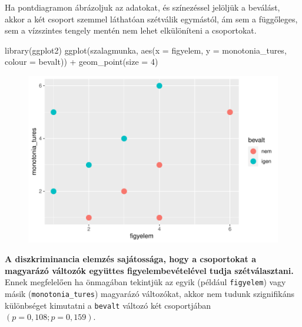 \documentclass[
  letterpaper,
]{krantz}
\makeatletter
\newenvironment{Shaded}{\begin{snugshade}}{\end{snugshade}}
\newcommand{\AttributeTok}[1]{\textcolor[rgb]{0.40,0.45,0.13}{#1}}
\newcommand{\CommentTok}[1]{\textcolor[rgb]{0.37,0.37,0.37}{#1}}
\newcommand{\DecValTok}[1]{\textcolor[rgb]{0.68,0.00,0.00}{#1}}
\newcommand{\FunctionTok}[1]{\textcolor[rgb]{0.28,0.35,0.67}{#1}}
\newcommand{\NormalTok}[1]{\textcolor[rgb]{0.00,0.23,0.31}{#1}}
\newcommand{\SpecialCharTok}[1]{\textcolor[rgb]{0.37,0.37,0.37}{#1}}
\newenvironment{kframe}{%
\medskip{}
\setlength{\fboxsep}{.8em}
 \def\at@end@of@kframe{}%
 \ifinner\ifhmode%
  \def\at@end@of@kframe{\end{minipage}}%
  \begin{minipage}{\columnwidth}%
 \fi\fi%
 \def\FrameCommand##1{\hskip\@totalleftmargin \hskip-\fboxsep
 \colorbox{shadecolor}{##1}\hskip-\fboxsep
     \hskip-\linewidth \hskip-\@totalleftmargin \hskip\columnwidth}%
 \MakeFramed {\advance\hsize-\width
   \@totalleftmargin\z@ \linewidth\hsize
   \@setminipage}}%
 {\par\unskip\endMakeFramed%
 \at@end@of@kframe}
\renewenvironment{Shaded}{\begin{kframe}}{\end{kframe}}
\makeatother
\begin{document}
Ha pontdiagramon ábrázoljuk az adatokat, és színezéssel jelöljük a
beválást, akkor a két csoport szemmel láthatóan szétválik egymástól, ám
sem a függőleges, sem a vízszintes tengely mentén nem lehet elkülöníteni
a csoportokat.

\begin{Shaded}
\begin{Highlighting}[]
\FunctionTok{library}\NormalTok{(ggplot2)}
\FunctionTok{ggplot}\NormalTok{(szalagmunka, }\FunctionTok{aes}\NormalTok{(}\AttributeTok{x =}\NormalTok{ figyelem, }\AttributeTok{y =}\NormalTok{ monotonia\_tures, }\AttributeTok{colour =}\NormalTok{ bevalt)) }\SpecialCharTok{+}
    \FunctionTok{geom\_point}\NormalTok{(}\AttributeTok{size =} \DecValTok{4}\NormalTok{)}
\end{Highlighting}
\end{Shaded}

\begin{figure}[H]

{\centering \includegraphics{./sec_diszkrimninancia_files/figure-pdf/unnamed-chunk-3-1.pdf}

}

\end{figure}

\textbf{A diszkriminancia elemzés sajátossága, hogy a csoportokat a
magyarázó változók együttes figyelembevételével tudja szétválasztani.}
Ennek megfelelően ha önmagában tekintjük az egyik (például
\texttt{figyelem}) vagy másik (\texttt{monotonia\_tures}) magyarázó
változókat, akkor nem tudunk szignifikáns különbséget kimutatni a
\texttt{bevalt} változó két csoportjában \((p = 0,108; p=0,159)\).

\begin{Shaded}
\end{Shaded}
\end{document}
